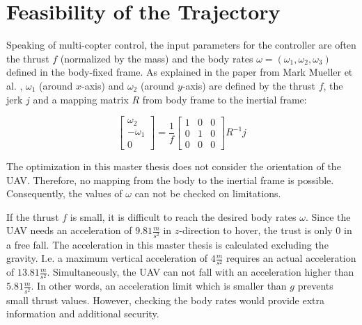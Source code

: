 \section{Feasibility of the Trajectory}

Speaking of multi-copter control, the input parameters for the controller are often the thrust $f$ (normalized by the mass) and the body rates $\omega = (\omega_1, \omega_2, \omega_3)$ defined in the body-fixed frame. As explained in the paper from Mark Mueller et al. \cite{mueller}, $\omega_1$ (around $x$-axis) and $\omega_2$ (around $y$-axis) are defined by the thrust $f$, the jerk $j$ and a mapping matrix $R$ from body frame to the inertial frame:

\begin{equation}
\begin{bmatrix}
   \omega_2 \\
  -\omega_1 \\
0
\end{bmatrix}
= \frac{1}{f}
\begin{bmatrix}
   1 & 0  &0\\
  0 & 1 & 0\\
0 & 0 &0
\end{bmatrix}
R^{-1}j
\label{equ:mueller}
\end{equation}\newline


The optimization in this master thesis does not consider the orientation of the UAV. Therefore, no mapping from the body to the inertial frame is possible. Consequently, the values of $\omega$ can not be checked on limitations. \newline

If the thrust $f$ is small, it is difficult to reach the desired body rates $\omega$. Since the UAV needs an acceleration of $9.81 \frac{m}{s^2}$ in $z$-direction to hover, the trust is only 0 in a free fall. 
The acceleration in this master thesis is calculated excluding the gravity. I.e. a maximum vertical acceleration of $4 \frac{m}{s^2}$ requires an actual acceleration of $13.81 \frac{m}{s^2}$. Simultaneously, the UAV can not fall with an acceleration higher than $5.81 \frac{m}{s^2}$. In other words, an acceleration limit which is smaller than $g$ prevents small thrust values. However, checking the body rates would provide extra information and additional security.



